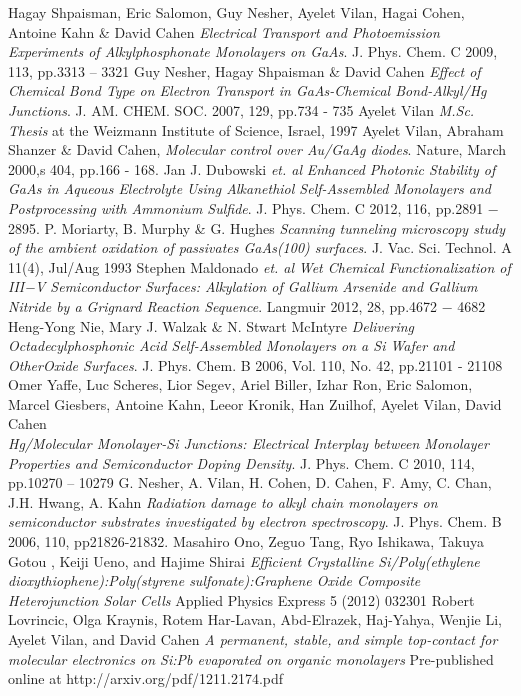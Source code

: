 \documentclass[a4paper]{article}
\begin{document}
\begin{thebibliography}{9}
	Hagay Shpaisman, Eric Salomon, Guy Nesher, Ayelet Vilan, Hagai Cohen, Antoine Kahn \& David Cahen
	\emph{Electrical Transport and Photoemission Experiments of Alkylphosphonate Monolayers on GaAs}.
	J. Phys. Chem. C 2009, 113, pp.{3313 – 3321}
	Guy Nesher, Hagay Shpaisman \& David Cahen
	\emph{Effect of Chemical Bond Type on Electron Transport in GaAs-Chemical Bond-Alkyl/Hg Junctions}.
	J. AM. CHEM. SOC. 2007, 129, pp.{734 - 735}
	Ayelet Vilan
	\emph{M.Sc. Thesis}
	at the Weizmann Institute of Science, Israel, 1997
  Ayelet Vilan, Abraham Shanzer \& David Cahen,
  \emph{Molecular control over Au/GaAg diodes}.
  Nature, March 2000,s 404, pp.{166 - 168}.
	Jan J. Dubowski \emph{et. al}
	\emph{Enhanced Photonic Stability of GaAs in Aqueous Electrolyte Using Alkanethiol Self-Assembled Monolayers and Postprocessing with Ammonium Sulfide}.
J. Phys. Chem. C 2012, 116, pp.{2891 − 2895}.
	P. Moriarty, B. Murphy \& G. Hughes
	\emph{Scanning tunneling microscopy study of the ambient oxidation of passivates GaAs(100) surfaces}.
	J. Vac. Sci. Technol. A 11(4), Jul/Aug 1993
	Stephen Maldonado \emph{et. al}
	\emph{Wet Chemical Functionalization of III−V Semiconductor Surfaces: Alkylation of Gallium Arsenide and Gallium Nitride by a Grignard Reaction Sequence}.
	Langmuir 2012, 28, pp.{4672 − 4682}
	Heng-Yong Nie, Mary J. Walzak \& N. Stwart McIntyre
	\emph{Delivering Octadecylphosphonic Acid Self-Assembled Monolayers on a Si Wafer and OtherOxide Surfaces}.
	J. Phys. Chem. B 2006, Vol. 110, No. 42, pp.{21101 - 21108}
	Omer Yaffe, Luc Scheres, Lior Segev, Ariel Biller, Izhar Ron, Eric Salomon, Marcel Giesbers, Antoine Kahn, Leeor Kronik, Han Zuilhof, Ayelet Vilan, David Cahen\\
	\emph{Hg/Molecular Monolayer-Si Junctions: Electrical Interplay between Monolayer Properties and Semiconductor Doping Density}.
	J. Phys. Chem. C 2010, 114, pp.{10270 – 10279}
	G. Nesher, A. Vilan, H. Cohen, D. Cahen, F. Amy, C. Chan, J.H. Hwang, A. Kahn
	\emph{Radiation damage to alkyl chain monolayers on semiconductor substrates investigated by electron spectroscopy}.
	J. Phys. Chem. B 2006, 110, pp{21826-21832}.
	Masahiro Ono, Zeguo Tang, Ryo Ishikawa, Takuya Gotou , Keiji Ueno, and Hajime Shirai
	\emph{Efficient Crystalline Si/Poly(ethylene dioxythiophene):Poly(styrene sulfonate):Graphene Oxide Composite Heterojunction Solar Cells}
	Applied Physics Express 5 (2012) 032301
	Robert Lovrincic, Olga Kraynis, Rotem Har-Lavan, Abd-Elrazek, Haj-Yahya, Wenjie Li, Ayelet Vilan, and David Cahen
	\emph{A permanent, stable, and simple top-contact for molecular electronics on Si:Pb evaporated on organic monolayers}
	Pre-published online at http://arxiv.org/pdf/1211.2174.pdf
\end{thebibliography}
\end{document}
